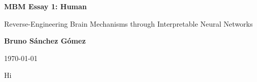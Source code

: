 \documentclass[11pt,a4paper]{article}
\begin{document}
\author{Bruno Sánchez Gómez}
\date{\today}

\begin{titlepage}
    \centering
    \vspace*{2cm}
    {\Huge \bfseries MBM Essay 1: Human \par}
    \vspace{2cm}
    {\Large {\Huge Reverse-Engineering Brain Mechanisms through Interpretable Neural Networks} \par}
    \vspace{8cm}
    {\large \textbf{Bruno Sánchez Gómez} \par}
    \vfill
    {\large \today \par}
\end{titlepage}

Hi

%

\clearpage
\printbibliography%
\end{document}
